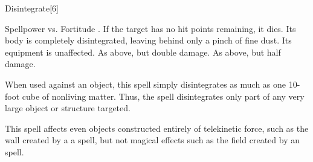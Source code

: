 \begin{spellsection}{Disintegrate}[6]
    \begin{spellheader}
    \end{spellheader}
    \begin{spellcontent}
        \begin{spelltargetinginfo}
        \end{spelltargetinginfo}
        \begin{spelleffects}
            \begin{spellattack}{Spellpower vs. Fortitude}
                \spellsuccess {}. If the target has no hit points remaining, it dies. Its body is completely disintegrated, leaving behind only a pinch of fine dust. Its equipment is unaffected.
                \spellcritical As above, but double damage.
                \spellfailure As above, but half damage.
            \end{spellattack}
            \spellspecial When used against an object, this spell simply disintegrates as much as one 10-foot cube of nonliving matter. Thus, the spell disintegrates only part of any very large object or structure targeted.
        \end{spelleffects}
    \end{spellcontent}
    \begin{spellfooter}
        \spellnotes This spell affects even objects constructed entirely of telekinetic force, such as the wall created by a a  spell, but not magical effects such as the field created by an  spell.
        \miscastrandom
    \end{spellfooter}
    \begin{spellaugments}
    \end{spellaugments}
\end{spellsection}

